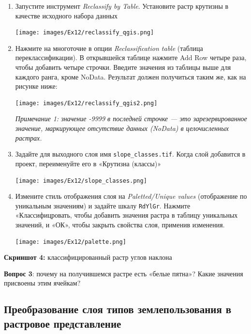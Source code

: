 \documentclass[
  12pt,
]{book}
\begin{document}
\begin{enumerate}
\def\labelenumi{\arabic{enumi}.}
\item
  Запустите инструмент \emph{Reclassify by Table}. Установите растр крутизны в качестве исходного набора данных

  \texttt{[image: images/Ex12/reclassify\_qgis.png]}
\item
  Нажмите на многоточие в опции \emph{Reclassification table} (таблица переклассификации). В открывшейся таблице нажмите Add Row четыре раза, чтобы добавить четыре строчки. Введите значения из таблицы выше для каждого ранга, кроме NoData. Результат должен получиться таким же, как на рисунке ниже:

  \texttt{[image: images/Ex12/reclassify\_qgis2.png]}

  \emph{Примечание 1: значение -9999 в последней строчке --- это зарезервированное значение, маркирующее отсутствие данных (NoData) в целочисленных растрах.}
\item
  Задайте для выходного слоя имя \texttt{slope\_classes.tif}. Когда слой добавится в проект, переименуйте его в «Крутизна (классы)»

  \texttt{[image: images/Ex12/slope\_classes.png]}
\item
  Измените стиль отображения слоя на \emph{Paletted/Unique values} (отображение по уникальным значениям) и задайте шкалу \texttt{RdYlGr}. Нажмите «Классифицровать, чтобы добавить значения растра в таблицу уникальных значений, и «ОК», чтобы закрыть свойства слоя, применив изменения.

  \texttt{[image: images/Ex12/palette.png]}
\end{enumerate}

\textbf{Скриншот 4:} классифицированный растр углов наклона

\textbf{Вопрос 3}: почему на получившемся растре есть «белые пятна»? Какие значения присвоены этим ячейкам?

\hypertarget{ux43fux440ux435ux43eux431ux440ux430ux437ux43eux432ux430ux43dux438ux435-ux441ux43bux43eux44f-ux442ux438ux43fux43eux432-ux437ux435ux43cux43bux435ux43fux43eux43bux44cux437ux43eux432ux430ux43dux438ux44f-ux432-ux440ux430ux441ux442ux440ux43eux432ux43eux435-ux43fux440ux435ux434ux441ux442ux430ux432ux43bux435ux43dux438ux435}{%
\subsection{Преобразование слоя типов землепользования в растровое представление}\label{ux43fux440ux435ux43eux431ux440ux430ux437ux43eux432ux430ux43dux438ux435-ux441ux43bux43eux44f-ux442ux438ux43fux43eux432-ux437ux435ux43cux43bux435ux43fux43eux43bux44cux437ux43eux432ux430ux43dux438ux44f-ux432-ux440ux430ux441ux442ux440ux43eux432ux43eux435-ux43fux440ux435ux434ux441ux442ux430ux432ux43bux435ux43dux438ux435}}
\end{document}
